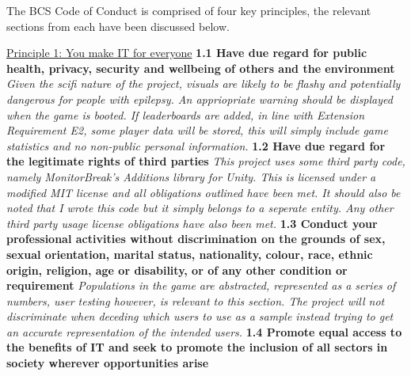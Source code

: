 \documentclass{report}
\begin{document}
The BCS Code of Conduct is comprised of four key principles, the relevant sections from each have been discussed below.
\newline
\newline
\begin{raggedright}
{\Large \underline{Principle 1: You make IT for everyone}}
\newline
\newline
\textbf{1.1 Have due regard for public health, privacy, security and wellbeing of others and the environment}
\newline
\newline
\textit{Given the scifi nature of the project, visuals are likely to be flashy and potentially dangerous for people with epilepsy. An appriopriate warning should be displayed when the game is booted. If leaderboards are added, in line with Extension Requirement E2, some player data will be stored, this will simply include game statistics and no non-public personal information.}
\newline
\newline
\textbf{1.2 Have due regard for the legitimate rights of third parties}
\newline
\newline
\textit{This project uses some third party code, namely MonitorBreak's Additions library for Unity. This is licensed under a modified MIT license\cite{additionsLicense} and all obligations outlined have been met. It should also be noted that I wrote this code but it simply belongs to a seperate entity.
Any other third party usage license obligations have also been met.}
\newline
\newline
\textbf{1.3 Conduct your professional activities without discrimination on the grounds of sex, sexual orientation, marital status, nationality, colour, race, ethnic origin, religion, age or disability, or of any other condition or requirement}
\newline
\newline
\textit{Populations in the game are abstracted, represented as a series of numbers, user testing however, is relevant to this section. The project will not discriminate when deceding which users to use as a sample instead trying to get an accurate representation of the intended users.}
\newline
\newline
\textbf{1.4 Promote equal access to the benefits of IT and seek to promote the inclusion of all sectors in society wherever opportunities arise}

\end{raggedright}
\end{document}
